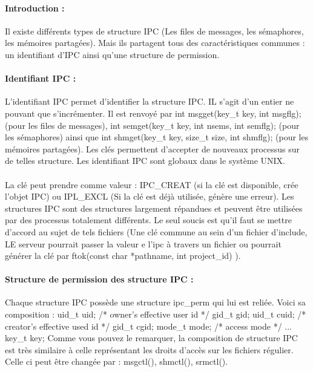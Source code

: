 \documentclass{article}[12pt]
\begin{document}
\paragraph{Introduction : } Il existe différents types de structure IPC (Les files de messages, les sémaphores, les mémoires partagées). Mais ils partagent tous des caractéristiques communes : un identifiant d'IPC ainsi qu'une structure de permission.
\paragraph{Identifiant IPC : } L'identifiant IPC permet d'identifier la structure IPC. IL s'agit d'un entier ne pouvant que s'incrémenter. Il est renvoyé par int msgget(key\_t key, int msgflg); (pour les files de messages), int semget(key\_t key, int nsems, int semflg); (pour les sémaphores) ainsi que int shmget(key\_t key, size\_t size, int shmflg); (pour les mémoires partagées). Les clés permettent d'accepter de nouveaux processus sur de telles structure. Les identifiant IPC sont globaux dans le système UNIX.\\ \\
La clé peut prendre comme valeur : IPC\_CREAT (si la clé est disponible, crée l'objet IPC) ou IPL\_EXCL  (Si la clé est déjà utilisée, génère une erreur). Les structures IPC sont des structures largement répandues et peuvent être utilisées par des processus totalement différents. Le seul soucis est qu'il faut se mettre d'accord au sujet de tels fichiers (Une clé commune au sein d'un fichier d'include, LE serveur pourrait passer la valeur e l'ipc à travers un fichier ou pourrait générer la clé par ftok(const char *pathname, int project\_id) ).
\paragraph{Structure de permission des structure IPC : } Chaque structure IPC possède une structure ipc\_perm qui lui est reliée.  Voici sa composition :
{ uid\_t uid; /* owner’s effective user id */ \newline
gid\_t gid; \newline
 uid\_t cuid; /* creator’s effective used id */ \newline
 gid\_t cgid; \newline
 mode\_t mode; /* access mode */\newline
 ... \newline
 key\_t key; } 
 \newline
 Comme vous pouvez le remarquer, la composition de structure IPC est très similaire à celle représentant les droits d'accès sur les fichiers régulier. Celle ci peut être changée par : msgctl(), shmctl(), srmctl().
\end{document}
